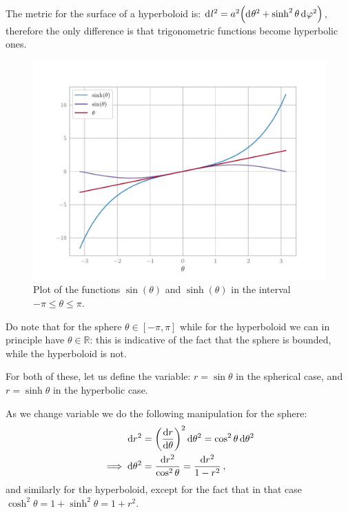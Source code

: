 \documentclass[main.tex]{subfiles}
\begin{document}
The metric for the surface of a hyperboloid is:
\(\dd[]{l^2} = a^2 \qty(\dd[]{\theta^2} + \sinh^2 \theta \dd[]{\varphi^2}) \),
therefore the only difference is that trigonometric functions become hyperbolic ones.

\begin{figure}[ht]
\centering
\includegraphics[width=\textwidth]{figures/sin_vs_sinh.pdf}
\caption{Plot of the functions \(\sin(\theta )\) and \(\sinh (\theta )\) in the interval \(-\pi \leq \theta\leq \pi  \).}
\label{fig:sin_vs_sinh}
\end{figure}

Do note that for the sphere \(\theta  \in [- \pi, \pi ]\) while for the hyperboloid we can in principle have \(\theta \in \mathbb{R}\): this is indicative of the fact that the sphere is bounded, while the hyperboloid is not.

For both of these, let us define the variable: \(r = \sin\theta \) in the spherical case, and \(r = \sinh \theta \)  in the hyperbolic case.

As we change variable we do the following manipulation for the sphere: 
%
\begin{subequations}
\begin{align}
\dd{r^2} &= \qty(\dv{r}{\theta })^2 \dd{\theta^2} = \cos^2\theta \dd{\theta^2}  \\
\implies \dd{\theta^2} &= \frac{\dd{r^2}}{\cos^2\theta } = \frac{\dd{r^2}}{1 - r^2}
\,,
\end{align}
\end{subequations}
%
and similarly for the hyperboloid, except for the fact that in that case \(\cosh^2 \theta  = 1 + \sinh^2\theta = 1+r^2 \).
\end{document}
